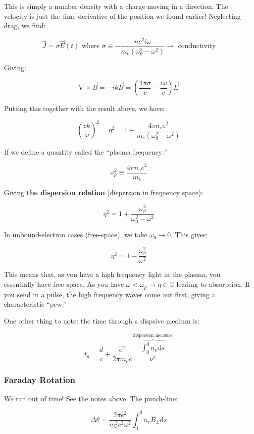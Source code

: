 \documentclass{article}
\def\Bfield{{\vec{B}}}
\def\Efield{{\vec {E}}}
\begin{document}
This is simply a number density with a charge moving in a direction. The velocity is just the time derivative of the position we found earlier! Neglecting drag, we find:

$$
\vec{J} = \sigma \Efield(t) \text{ where } \sigma \equiv -\frac{n e^2 i \omega}{m_e\left(\omega_0^2 - \omega^2\right)} \rightarrow \text{ conductivity}
$$

Giving:

$$
\nabla \times \Bfield = -ik\Bfield = \left(\frac{4\pi \sigma}{c} - \frac{i\omega}{c}\right)\vec{E}
$$

Putting this together with the result above, we have:

$$
\left(\frac{ck}{\omega}\right)^2 = \eta^2 = 1 + \frac{4\pi n_e e^2}{m_e \left(\omega_0^2 - \omega^2\right)}
$$

If we define a quantity called the ``plasma frequency:''

$$
\omega_p^2 \equiv \frac{4\pi n_e e^2}{m_e}
$$

Giving \textbf{the dispersion relation} (dispersion in frequency space):

$$
\boxed{\eta^2 = 1+ \frac{\omega_p^2}{\omega_0^2 - \omega^2}}
$$

In unbound-electron cases (free-space), we take $\omega_0 \to 0$. This gives:

$$
\eta^2 = 1 - \frac{\omega_p^2}{\omega^2}
$$

This means that, as you have a high frequency light in the plasma, you essentially have free space. As you have $\omega < \omega_p \rightarrow \eta \in \mathbb{C}$ leading to absorption. If you send in a pulse, the high frequency waves come out first, giving a characteristic ``pew.'' 

One other thing to note: the time through a dispsive medium is:

$$
t_d = \frac{d}{c} + \frac{e^2}{2\pi m_e c} \frac{\overbrace{\int_0^d n_e \mathrm{d}s}^\text{dispersion measure}}{\nu^2}
$$

\subsubsection{Faraday Rotation}

We ran out of time! See the notes above. The punch-line:

$$
\Delta \theta = \frac{2\pi e^2}{m_e^2 c^2 \omega^2} \int_0^d n_e B_\perp \mathrm{d} s
$$

\newpage
\end{document}
